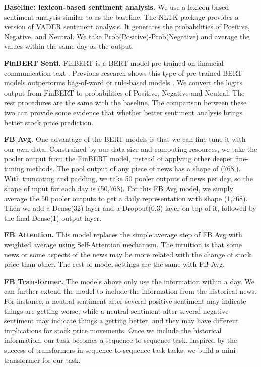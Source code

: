 \documentclass[11pt]{article}
\begin{document}
\textbf{Baseline: lexicon-based sentiment analysis.} We use a lexicon-based sentiment analysis similar to \citet{hao2021} as the baseline. The NLTK package provides a version of VADER \citep{Hutto_Gilbert_2014} sentiment analysis. It generates the probabilities of Positive, Negative, and Neutral. We take Prob(Positive)-Prob(Negative) and average the values within the same day as the output.

\textbf{FinBERT Senti.} FinBERT is a BERT model pre-trained on financial communication text \citep{yang2020finbert}. Previous research shows this type of pre-trained BERT models outperforms bag-of-word or rule-based models \citep{yang2020finbert,ijcai2020p622,araci2019finbert}. We convert the logits output from FinBERT to probabilities of Positive, Negative and Neutral. The rest procedures are the same with the baseline. The comparison between these two can provide some evidence that whether better sentiment analysis brings better stock price prediction. 

\textbf{FB Avg.} One advantage of the BERT models is that we can fine-tune it with our own data. Constrained by our data size and computing resources, we take the pooler output from the FinBERT model, instead of applying other deeper fine-tuning methods. The pool output of any piece of news has a shape of (768,). With truncating and padding, we take 50 pooler outputs of news per day, so the shape of input for each day is (50,768). For this FB Avg model, we simply average the 50 pooler outputs to get a daily representation with shape (1,768). Then we add a Dense(32) layer and a Dropout(0.3) layer on top of it, followed by the final Dense(1) output layer.   

\textbf{FB Attention.} This model replaces the simple average step of FB Avg with weighted average using Self-Attention mechanism. The intuition is that some news or some aspects of the news may be more related with the change of stock price than other. The rest of model settings are the same with FB Avg.

\textbf{FB Transformer.} The models above only use the information within a day. We can further extend the model to include the information from the historical news. For instance, a neutral sentiment after several positive sentiment may indicate things are getting worse, while a neutral sentiment after several negative sentiment may indicate things a getting better, and they may have different implications for stock price movements. Once we include the historical information, our task becomes a sequence-to-sequence task. Inspired by the success of transformers in sequence-to-sequence task tasks, we build a mini-transformer for our task.
\end{document}
